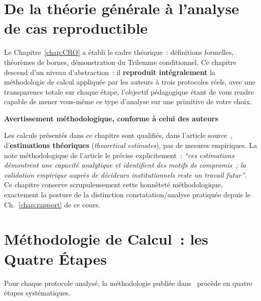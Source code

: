 \bigskip

\section*{De la théorie générale à l'analyse de cas reproductible}

Le Chapitre~\ref{chap:CRO} a établi le cadre théorique~: définitions
formelles, théorèmes de bornes, démonstration du Trilemme conditionnel.
Ce chapitre descend d'un niveau d'abstraction~: il \textbf{reproduit
intégralement} la méthodologie de calcul appliquée par les auteurs
à trois protocoles réels, avec une transparence totale sur chaque
étape, l'objectif pédagogique étant de vous rendre capable de
mener vous-même ce type d'analyse sur une primitive de votre choix.

\begin{boxalert}
\textbf{Avertissement méthodologique, conforme à celui des auteurs}

Les calculs présentés dans ce chapitre sont qualifiés, dans
l'article source~\cite{minka2026clo}, d'\textbf{estimations
théoriques} (\textit{theoretical estimates}), pas de mesures
empiriques. La note méthodologique de l'article le précise
explicitement~: \textit{``ces estimations démontrent une capacité
analytique et identifient des motifs de compromis~; la validation
empirique auprès de décideurs institutionnels reste un travail
futur''}. Ce chapitre conserve scrupuleusement cette honnêteté
méthodologique, exactement la posture de la distinction
constatation/analyse pratiquée depuis le Ch.~\ref{chap:rapport}
de ce cours.
\end{boxalert}

\separateur

\section{Méthodologie de Calcul~: les Quatre Étapes}
\label{sec:methodologie}

Pour chaque protocole analysé, la méthodologie publiée
dans~\cite{minka2026clo} procède en quatre étapes systématiques.

